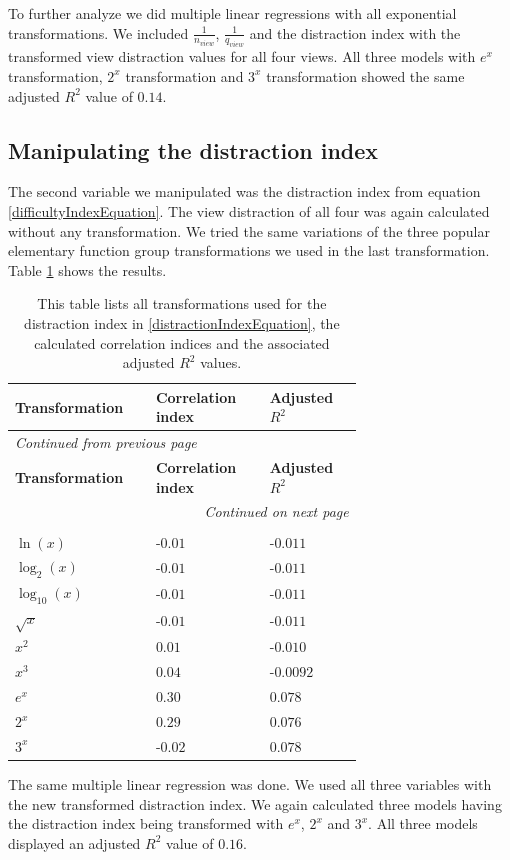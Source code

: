 To further analyze we did multiple linear regressions with all exponential transformations. We included
$\frac{1}{n_{view}}$, $\frac{1}{q_{view}}$ and the distraction index with the transformed view distraction values for all four views. All three models
with $e^x$ transformation, $2^x$ transformation and $3^x$ transformation showed the same adjusted $R^2$ value of $0.14$.

\subsection{Manipulating the distraction index}
The second variable we manipulated was the distraction index from equation \ref{difficultyIndexEquation}. The view distraction of all four was again calculated
without any transformation. We tried the same variations of the three popular elementary function group transformations we used in the last transformation.
Table \ref{distractionIndexTransformations} shows the results.

\begin{longtable}{| p{0.24\linewidth} | p{0.25\linewidth} | p{0.20\linewidth}|}
    \hline
    \textbf{Transformation} & \textbf{Correlation index} & \textbf{Adjusted $R^2$} \\
    \hline
    \endfirsthead
    \multicolumn{3}{l}{{\textit{Continued from previous page}}} \\
    \hline
    \textbf{Transformation} & \textbf{Correlation index} & \textbf{Adjusted $R^2$} \\
    \hline
    \endhead
    \hline \multicolumn{3}{r}{{\textit{Continued on next page}}} \\
    \endfoot
    \hline
    \caption{This table lists all transformations used for the distraction index in \ref{distractionIndexEquation}, the calculated correlation indices and the associated adjusted $R^2$ values. \label{distractionIndexTransformations}}\\
    \endlastfoot
    $ \ln(x) $ & -$0.01$ & -$0.011$ \\
    \hline
    $ \log_{2}(x) $ & -$0.01$ & -$0.011$ \\
    \hline
    $ \log_{10}(x) $ & -$0.01$ & -$0.011$ \\
    \hline
    $ \sqrt{x} $ & -$0.01$ & -$0.011$ \\
    \hline
    $ x^2 $ & $0.01$ & -$0.010$ \\
    \hline
    $ x^3 $ & $0.04$ & -$0.0092$ \\
    \hline
    $ e^x $ & $0.30$ & $0.078$ \\
    \hline
    $ 2^x $ & $0.29$ & $0.076$ \\
    \hline
    $ 3^x $ & -$0.02$ & $0.078$ \\
\end{longtable}
The same multiple linear regression was done. We used all three variables with the new transformed distraction index. We again calculated three
models having the distraction index being transformed with $e^x$, $2^x$ and $3^x$. All three models displayed an adjusted $R^2$ value of $0.16$.

